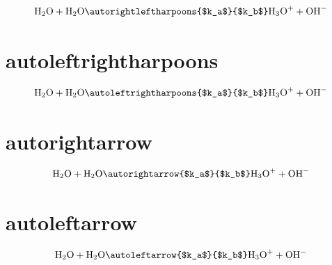 \documentclass[fleqn,12pt,a4paper]{article}
\begin{document}
\begin{displaymath}
\aqua + \aqua \autorightleftharpoons{$k_a$}{$k_b$} \acid + \base
\end{displaymath}


\section{autoleftrightharpoons}


\begin{displaymath}
\aqua + \aqua \autoleftrightharpoons{$k_a$}{$k_b$} \acid + \base
\end{displaymath}


\section{autorightarrow}


\begin{displaymath}
\aqua + \aqua \autorightarrow{$k_a$}{$k_b$} \acid + \base
\end{displaymath}


\section{autoleftarrow}


\begin{displaymath}
\aqua + \aqua \autoleftarrow{$k_a$}{$k_b$} \acid + \base
\end{displaymath}
\end{document}

